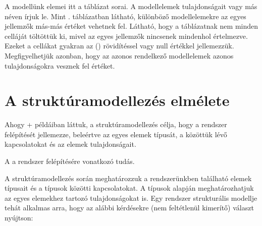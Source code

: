 A modellünk elemei itt a táblázat sorai. A modellelemek tulajdonságait  vagy más néven  írjuk le. Mint . táblázatban látható, különböző modellelemekre az egyes jellemzők más-más értéket vehetnek fel. Látható, hogy a táblázatnak nem minden celláját töltöttük ki, mivel az egyes jellemzők nincsenek mindenhol értelmezve. Ezeket a cellákat gyakran az  () rövidítéssel vagy \textsf{null} értékkel jellemezzük. Megfigyelhetjük azonban, hogy az azonos  rendelkező modellelemek azonos tulajdonságokra vesznek fel értéket.




\section{A struktúramodellezés elmélete}

Ahogy \az+ példáiban láttuk, a struktúramodellezés célja, hogy a rendszer felépítését jellemezze, beleértve az egyes elemek típusát, a közöttük lévő kapcsolatokat és az elemek tulajdonságait.

\begin{definicio}
	A  a rendszer felépítésére vonatkozó tudás.
\end{definicio}

%

A struktúramodellezés során meghatározzuk a rendszerünkben található elemek típusait és a típusok közötti kapcsolatokat. A típusok alapján meghatározhatjuk az egyes elemekhez tartozó tulajdonságokat is. Egy rendszer strukturális modellje tehát alkalmas arra, hogy az alábbi kérdésekre (nem feltétlenül kimerítő) választ nyújtson:

